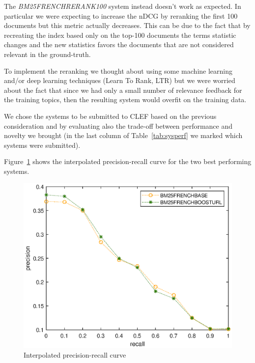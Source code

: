 \par The \textit{BM25FRENCHRERANK100} system instead doesn't work as expected. In particular we were expecting to increase the nDCG by reranking the first 100 documents but this metric actually decreases. This can be due to the fact that by recreating the index based only on the top-100 documents the terms statistic changes and the new statistics favors the documents that are not considered relevant in the ground-truth.
\par To implement the reranking we thought about using some machine learning and/or deep learning techniques (Learn To Rank, LTR) but we were worried about the fact that since we had only a small number of relevance feedback for the training topics, then the resulting system would overfit on the training data.
\par We chose the systems to be submitted to CLEF based on the previous consideration and by evaluating also the trade-off between performance and novelty we brought (in the last column of Table~\ref{tab:sysperf} we marked which systems were submitted).
\par
Figure~\ref{fig:prcurve} shows the interpolated precision-recall curve for the two best performing systems.
\begin{figure}[tb]
    \centering
    \includegraphics[scale=0.8]{figure/curve.eps}
    \caption{Interpolated precision-recall curve}
    \label{fig:prcurve}
\end{figure}



